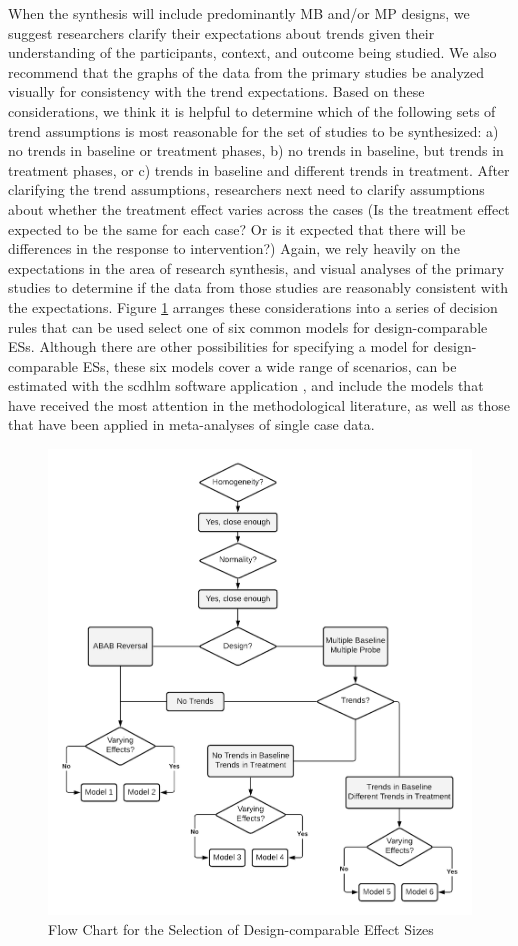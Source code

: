 \documentclass[
]{book}
\begin{document}
When the synthesis will include predominantly MB and/or MP designs, we suggest researchers clarify their expectations about trends given their understanding of the participants, context, and outcome being studied. We also recommend that the graphs of the data from the primary studies be analyzed visually for consistency with the trend expectations. Based on these considerations, we think it is helpful to determine which of the following sets of trend assumptions is most reasonable for the set of studies to be synthesized: a) no trends in baseline or treatment phases, b) no trends in baseline, but trends in treatment phases, or c) trends in baseline and different trends in treatment. After clarifying the trend assumptions, researchers next need to clarify assumptions about whether the treatment effect varies across the cases (Is the treatment effect expected to be the same for each case? Or is it expected that there will be differences in the response to intervention?) Again, we rely heavily on the expectations in the area of research synthesis, and visual analyses of the primary studies to determine if the data from those studies are reasonably consistent with the expectations. Figure \ref{fig:DC-ES-flow-chart} arranges these considerations into a series of decision rules that can be used select one of six common models for design-comparable ESs. Although there are other possibilities for specifying a model for design-comparable ESs, these six models cover a wide range of scenarios, can be estimated with the scdhlm software application \citep{pustejovsky2021scdhlm}, and include the models that have received the most attention in the methodological literature, as well as those that have been applied in meta-analyses of single case data.

\begin{figure}
\includegraphics[width=1\linewidth]{images/DC-ES-flow-chart} \caption{Flow Chart for the Selection of Design-comparable Effect Sizes}\label{fig:DC-ES-flow-chart}
\end{figure}

  
\end{document}

